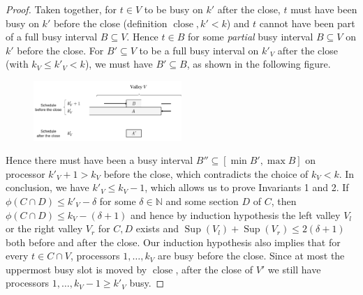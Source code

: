 \documentclass[a4paper]{article}
\DeclareMathOperator{\close}{close}
\DeclareMathOperator{\res}{Sup}
\begin{document}
\begin{proof}
      Taken together, for $t \in V$ to be busy on $k'$ after the close, $t$ must have been busy on $k'$ before the close (definition $\close, k' < k$) and $t$ cannot have been part of a full busy interval $B \subseteq V$.
      Hence $t \in B$ for some \emph{partial} busy interval $B \subseteq V$ on $k'$ before the close.
      For $B' \subseteq V$ to be a full busy interval on $k'_V$ after the close (with $k_V \leq k'_V < k$), we must have $B' \subseteq B$, as shown in the following figure.
      \begin{figure}[H]
        \centering
        \includegraphics[width=0.5\textwidth]{graphics/invariant_case1.jpg}


      \end{figure}
      Hence there must have been a busy interval $B'' \subseteq [\min B', \max B]$ on processor $k'_V + 1 > k_V$ before the close, which contradicts the choice of $k_V < k$.
      In conclusion, we have $k'_V \leq k_V - 1$, which allows us to prove Invariants 1 and 2.
      If $\phi(C \cap D) \leq k'_{V} - \delta$ for some $\delta \in \mathbb{N}$ and some section $D$ of $C$, then $\phi(C \cap D) \leq k_V - (\delta + 1)$ and hence by induction hypothesis the left valley $V_l$ or the right valley $V_r$ for $C, D$ exists and $\res(V_l) + \res(V_r) \leq 2 (\delta + 1)$ both before and after the close.
      Our induction hypothesis also implies that for every $t \in C \cap V$, processors $1, \ldots, k_V$ are busy before the close.
      Since at most the uppermost busy slot is moved by $\close$, after the close of $V'$ we still have processors $1, \ldots, k_V - 1 \geq k'_V$ busy.


\end{proof}
\end{document}

